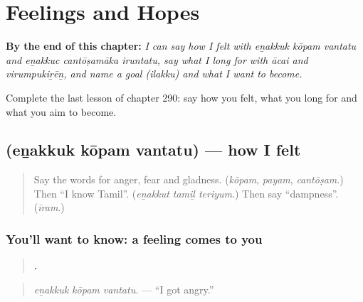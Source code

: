 
\chapter{Feelings and Hopes}
\label{ch:ta-feelings-and-hopes}

\begin{chapteropening}
\textbf{By the end of this chapter:} \emph{I can say how I felt with eṉakkuk kōpam vantatu and eṉakkuc cantōṣamāka iruntatu, say what I long for with ācai and virumpukiṟēṉ, and name a goal (ilakku) and what I want to become.}

Complete the last lesson of chapter 290: say how you felt, what you long for and what you aim to become.
\end{chapteropening}

\section[\texorpdfstring{\ta{எனக்குக்} \ta{கோபம்} \ta{வந்தது} (eṉakkuk kōpam …)}{எனக்குக் கோபம் வந்தது (eṉakkuk kōpam …)}]{   (eṉakkuk kōpam vantatu) — how I felt}

\label{lesson:TA-C290-kopam-vantatu}



\begin{quote}
Say the words for anger, fear and gladness. (\emph{kōpam}, \emph{payam}, \emph{cantōṣam}.) Then \textquotedblleft{}I know Tamil\textquotedblright{}. (\emph{eṉakkut tamiḻ teriyum}.) Then say \textquotedblleft{}dampness\textquotedblright{}. (\emph{īram}.)
\end{quote}

\subsection*{You'll want to know: a feeling comes to you}
\begin{quote}
\textbf{  .}
\end{quote}

\begin{quote}
\emph{eṉakkuk kōpam vantatu.} — \textquotedblleft{}I got angry.\textquotedblright{}
\end{quote}

